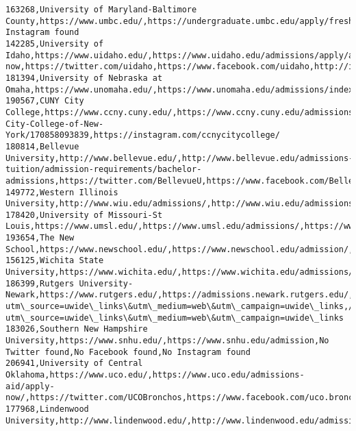 \documentclass[11pt]{article}
\begin{document}
\begin{Verbatim}[commandchars=\\\{\}]
163268,University of Maryland-Baltimore County,https://www.umbc.edu/,https://undergraduate.umbc.edu/apply/freshmen.php,http://twitter.com/umbc,https://www.facebook.com/umbcpage,No Instagram found
142285,University of Idaho,https://www.uidaho.edu/,https://www.uidaho.edu/admissions/apply/apply-now,https://twitter.com/uidaho,https://www.facebook.com/uidaho,http://instagram.com/uidaho
181394,University of Nebraska at Omaha,https://www.unomaha.edu/,https://www.unomaha.edu/admissions/index.php,https://twitter.com/unomaha,https://www.facebook.com/unomaha/,https://www.instagram.com/unomaha/
190567,CUNY City College,https://www.ccny.cuny.edu/,https://www.ccny.cuny.edu/admissions,https://twitter.com/citycollegeny,https://www.facebook.com/pages/The-City-College-of-New-York/170858093839,https://instagram.com/ccnycitycollege/
180814,Bellevue University,http://www.bellevue.edu/,http://www.bellevue.edu/admissions-tuition/admission-requirements/bachelor-admissions,https://twitter.com/BellevueU,https://www.facebook.com/BellevueUniversity,https://instagram.com/bellevueuniversity/
149772,Western Illinois University,http://www.wiu.edu/admissions/,http://www.wiu.edu/admissions/,https://twitter.com/WIUAdmissions,https://www.facebook.com/WIUAdmissions,http://instagram.com/wiuadmissions
178420,University of Missouri-St Louis,https://www.umsl.edu/,https://www.umsl.edu/admissions/,https://www.twitter.com/umsl,https://www.facebook.com/UMSL.edu,https://www.instagram.com/umsl/
193654,The New School,https://www.newschool.edu/,https://www.newschool.edu/admission/,https://twitter.com/thenewschool,https://www.facebook.com/thenewschool,https://www.instagram.com/TheNewSchool/
156125,Wichita State University,https://www.wichita.edu/,https://www.wichita.edu/admissions/,https://twitter.com/wichitastate/,https://www.facebook.com/wichita.state/,https://www.instagram.com/wichita\_state\_u/
186399,Rutgers University-Newark,https://www.rutgers.edu/,https://admissions.newark.rutgers.edu/,https://twitter.com/RutgersU,//www.facebook.com/RutgersU?utm\_source=uwide\_links\&utm\_medium=web\&utm\_campaign=uwide\_links,//instagram.com/RutgersU?utm\_source=uwide\_links\&utm\_medium=web\&utm\_campaign=uwide\_links
183026,Southern New Hampshire University,https://www.snhu.edu/,https://www.snhu.edu/admission,No Twitter found,No Facebook found,No Instagram found
206941,University of Central Oklahoma,https://www.uco.edu/,https://www.uco.edu/admissions-aid/apply-now/,https://twitter.com/UCOBronchos,https://www.facebook.com/uco.bronchos/,http://www.instagram.com/ucobronchos
177968,Lindenwood University,http://www.lindenwood.edu/,http://www.lindenwood.edu/admissions/,https://twitter.com/lindenwoodu,https://www.facebook.com/LindenwoodUniversity,https://www.instagram.com/lindenwooduniversity

\end{Verbatim}
\end{document}
